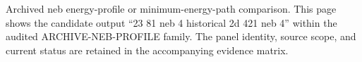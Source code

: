 Archived neb energy-profile or minimum-energy-path comparison. This page shows the candidate output ``23 81 neb 4 historical 2d 421 neb 4'' within the audited ARCHIVE-NEB-PROFILE family. The panel identity, source scope, and current status are retained in the accompanying evidence matrix.
